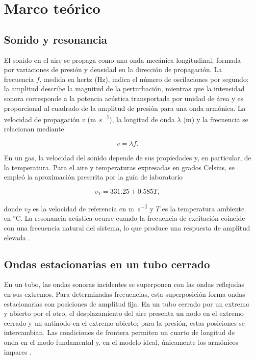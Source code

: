 \section{Marco teórico}

\subsection{Sonido y resonancia}

El sonido en el aire se propaga como una onda mecánica longitudinal, formada por variaciones de presión y densidad en la dirección de propagación. La frecuencia $f$, medida en hertz (\si{\hertz}), indica el número de oscilaciones por segundo; la amplitud describe la magnitud de la perturbación, mientras que la intensidad sonora corresponde a la potencia acústica transportada por unidad de área y es proporcional al cuadrado de la amplitud de presión para una onda armónica. La velocidad de propagación $v$ (\si{\meter\per\second}), la longitud de onda $\lambda$ (\si{\meter}) y la frecuencia se relacionan mediante \cite{halliday2018,openstax2016}

\begin{equation}
v=\lambda f.
\label{eq:velocidad_onda}
\end{equation}

En un gas, la velocidad del sonido depende de sus propiedades y, en particular, de la temperatura. Para el aire y temperaturas expresadas en grados Celsius, se empleó la aproximación prescrita por la guía de laboratorio \cite{guiauca}

\begin{equation}
v_T=331.25+0.585T,
\label{eq:velocidad_temperatura}
\end{equation}

donde $v_T$ es la velocidad de referencia en \si{\meter\per\second} y $T$ es la temperatura ambiente en \si{\degreeCelsius}. La resonancia acústica ocurre cuando la frecuencia de excitación coincide con una frecuencia natural del sistema, lo que produce una respuesta de amplitud elevada \cite{halliday2018,openstax2016}.

\subsection{Ondas estacionarias en un tubo cerrado}

En un tubo, las ondas sonoras incidentes se superponen con las ondas reflejadas en sus extremos. Para determinadas frecuencias, esta superposición forma ondas estacionarias con posiciones de amplitud fija. En un tubo cerrado por un extremo y abierto por el otro, el desplazamiento del aire presenta un nodo en el extremo cerrado y un antinodo en el extremo abierto; para la presión, estas posiciones se intercambian. Las condiciones de frontera permiten un cuarto de longitud de onda en el modo fundamental y, en el modelo ideal, únicamente los armónicos impares \cite{halliday2018,openstax2016}.

